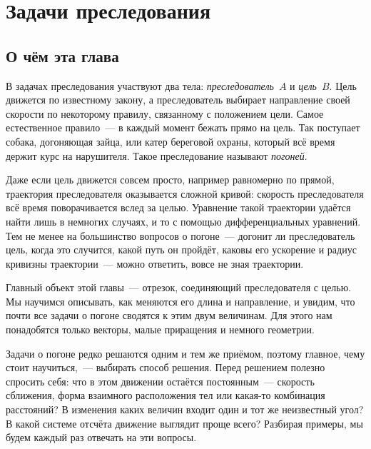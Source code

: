 \documentclass[../main.tex]{subfiles}
\begin{document}
\newsavebox{\purboxA}
\newsavebox{\purboxB}
\setcounter{section}{4}
\section{Задачи преследования}

\subsection{О чём эта глава}

В задачах преследования участвуют два тела: \textit{преследователь}~$A$ и
\textit{цель}~$B$. Цель движется по известному закону, а преследователь выбирает
направление своей скорости по некоторому правилу, связанному с положением цели.
Самое естественное правило~--- в каждый момент бежать прямо на цель. Так поступает
собака, догоняющая зайца, или катер береговой охраны, который всё время держит курс
на нарушителя. Такое преследование называют \textit{погоней}.

Даже если цель движется совсем просто, например равномерно по прямой, траектория
преследователя оказывается сложной кривой: скорость преследователя всё время
поворачивается вслед за целью. Уравнение такой траектории удаётся найти лишь в
немногих случаях, и то с помощью дифференциальных уравнений. Тем не менее на
большинство вопросов о погоне~--- догонит ли преследователь цель, когда это
случится, какой путь он пройдёт, каковы его ускорение и радиус кривизны
траектории~--- можно ответить, вовсе не зная траектории.

Главный объект этой главы~--- отрезок, соединяющий преследователя с целью. Мы
научимся описывать, как меняются его длина и направление, и увидим, что почти все
задачи о погоне сводятся к этим двум величинам. Для этого нам понадобятся только
векторы, малые приращения и немного геометрии.

Задачи о погоне редко решаются одним и тем же приёмом, поэтому главное, чему стоит
научиться,~--- выбирать способ решения. Перед решением полезно спросить себя: что в
этом движении остаётся постоянным~--- скорость сближения, форма взаимного
расположения тел или какая-то комбинация расстояний? В изменения каких величин
входит один и тот же неизвестный угол? В какой системе отсчёта движение выглядит
проще всего? Разбирая примеры, мы будем каждый раз отвечать на эти вопросы.
\end{document}
